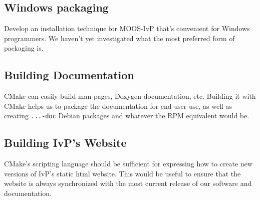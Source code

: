 \documentclass[letterpaper,10pt]{article}
\begin{document}
\subsection{Windows packaging}
Develop an installation technique for MOOS-IvP that's convenient for Windows
programmers.  We haven't yet investigated what the most preferred form of
packaging is.

\subsection{Building Documentation}
CMake can easily build man pages, Doxygen documentation, etc.  Building it
with CMake helps us to package the documentation for end-user use, as well
as creating \verb|...-doc| Debian packages and whatever the RPM equivalent
would be.

\subsection{Building IvP's Website}
CMake's scripting language should be sufficient for expressing how to create
new versions of IvP's static html website.  This would be useful to ensure that
the website is always synchronized with the most current release of our software
and documentation.
\end{document}
